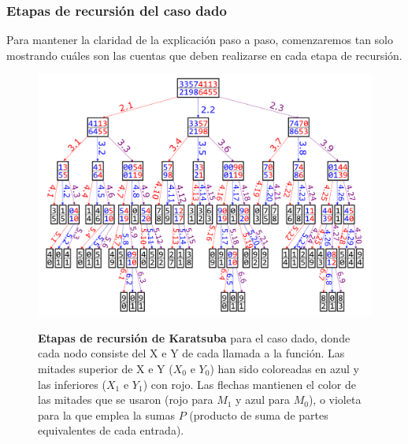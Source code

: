 \documentclass[titlepage,a4paper]{article}
\begin{document}
\subsubsection{Etapas de recursión del caso dado}
Para mantener la claridad de la explicación paso a paso, comenzaremos tan solo mostrando cuáles son las cuentas que deben realizarse en cada etapa de recursión.

\begin{figure}[H]
\centering
\includegraphics[width=\textwidth,angle=90,origin=c]{KaratsubaArbol.png}
\caption{\label{fig:etapas}}\textbf{Etapas de recursión de Karatsuba} para el caso dado,
donde cada nodo consiste del X e Y de cada llamada a la función. 
Las mitades superior de X e Y ($X_0$ e $Y_0$) han sido coloreadas en azul
y las inferiores ($X_1$ e $Y_1$) con rojo.
Las flechas mantienen el color de las mitades que se usaron (rojo para $M_1$ y azul para $M_0$),
o violeta para la que emplea la sumas $P$ (producto de suma de partes equivalentes de cada entrada).
\end{figure}
\end{document}
